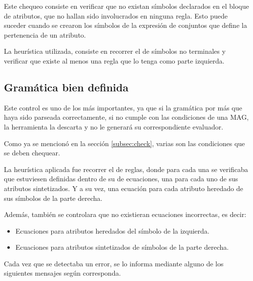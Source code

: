 Este chequeo consiste en verificar que no existan símbolos declarados en el bloque de atributos, que no hallan sido involucrados en ninguna regla. Esto puede suceder cuando se crearon los símbolos de la expresión de conjuntos que define la pertenencia de un atributo.

La heurística utilizada, consiste en recorrer el  de símbolos no terminales y verificar que existe al menos una regla que lo tenga como parte izquierda.

\subsection{Gramática bien definida}

Este control es uno de los más importantes, ya que si la gramática por más que haya sido parseada correctamente, si no cumple con las condiciones de una MAG, la herramienta la descarta y no le generará su correspondiente evaluador.

Como ya se mencionó en la sección \ref{subsec:check}, varias son las condiciones que se deben chequear.

La heurística aplicada fue recorrer el  de reglas, donde para cada una se verificaba que estuviesen definidas dentro de su  de ecuaciones, una para cada uno de sus atributos sintetizados. Y a su vez, una ecuación para cada atributo heredado de sus símbolos de la parte derecha.

Además, también se controlara que no existieran ecuaciones incorrectas, es decir:
\begin{itemize}
\item Ecuaciones para atributos heredados del símbolo de la izquierda.
\item Ecuaciones para atributos sintetizados de símbolos de la parte derecha.
\end{itemize}

Cada vez que se detectaba un error, se lo informa mediante alguno de los siguientes mensajes según corresponda.
\footnotesize{}

